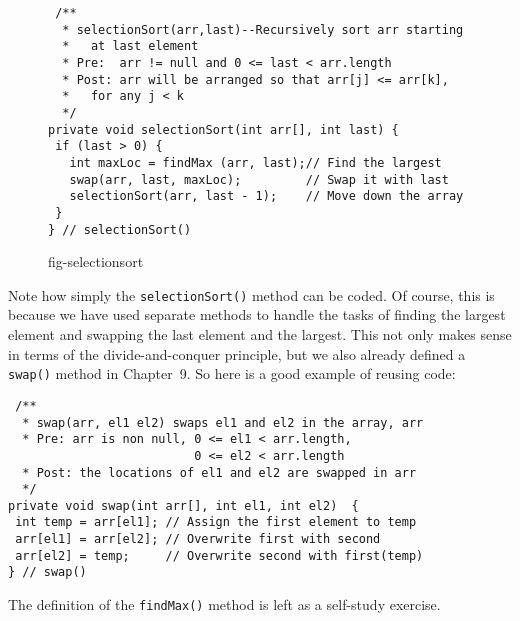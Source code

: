 \begin{figure}[tb]
\jjjprogstart
\begin{jjjlisting}
\begin{lstlisting}
 /**
  * selectionSort(arr,last)--Recursively sort arr starting 
  *   at last element
  * Pre:  arr != null and 0 <= last < arr.length
  * Post: arr will be arranged so that arr[j] <= arr[k], 
  *   for any j < k
  */
private void selectionSort(int arr[], int last) {
 if (last > 0) {
   int maxLoc = findMax (arr, last);// Find the largest
   swap(arr, last, maxLoc);         // Swap it with last
   selectionSort(arr, last - 1);    // Move down the array
 }
} // selectionSort()
\end{lstlisting}
\end{jjjlisting}
{fig-selectionsort}
\end{figure}

Note how simply the {\tt selectionSort()} method can be coded.   Of
course, this is because we have used separate methods to handle the
tasks of finding the largest element and swapping the last element and
the largest.  This not only makes sense in terms of the
divide-and-conquer principle, but we also already defined a {\tt swap()}
method in Chapter~9. So here is a good example of 
reusing code:

\begin{jjjlisting}
\begin{lstlisting}
 /**
  * swap(arr, el1 el2) swaps el1 and el2 in the array, arr
  * Pre: arr is non null, 0 <= el1 < arr.length, 
                          0 <= el2 < arr.length
  * Post: the locations of el1 and el2 are swapped in arr
  */
private void swap(int arr[], int el1, int el2)  {
 int temp = arr[el1]; // Assign the first element to temp
 arr[el1] = arr[el2]; // Overwrite first with second
 arr[el2] = temp;     // Overwrite second with first(temp)
} // swap()
\end{lstlisting}
\end{jjjlisting}

\noindent The definition of the {\tt findMax()} method is left as a
self-study exercise.



